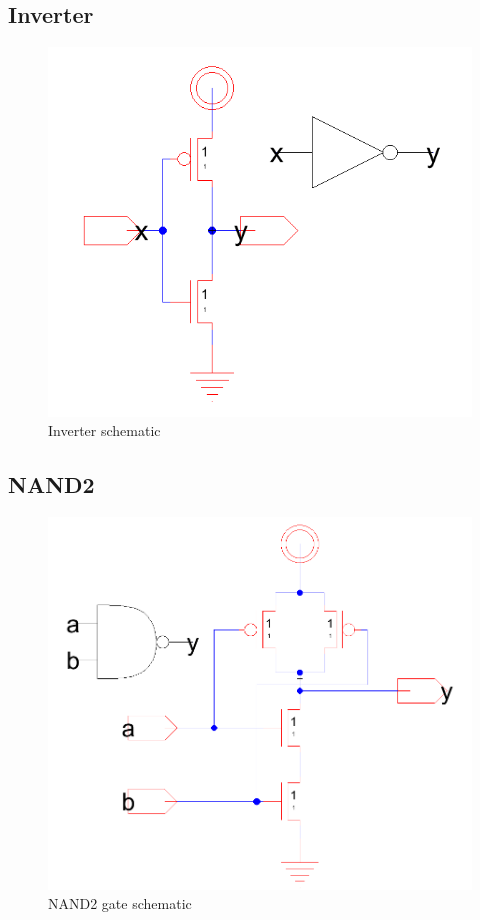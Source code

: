 \documentclass[12pt]{report}
\begin{document}
\subsection*{Inverter}
\begin{figure}[H]
  \centering
    \includegraphics[width=1.0\textwidth]{Schematics/inverter_schematic.PNG}
  \caption{Inverter schematic}
  \label{fig:inverter_schematic}
\end{figure}

\subsection*{NAND2}
\begin{figure}[H]
  \centering
    \includegraphics[width=1.0\textwidth]{Schematics/nand_gate_schematic.PNG}
  \caption{NAND2 gate schematic}
  \label{fig:nand_gate_schematic}
\end{figure}
\end{document}
